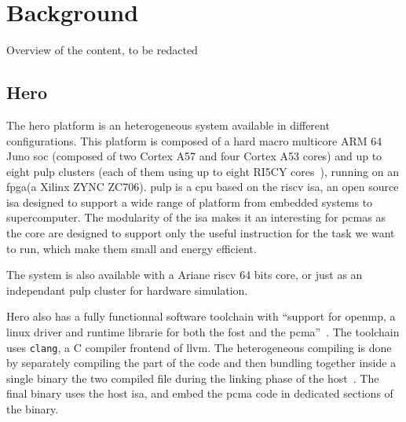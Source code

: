 
\chapter{Background}
		Overview of the content, to be redacted
\section{Hero}
	The \gls{hero} platform is an heterogeneous system available in different configurations. 
	This platform is composed of a hard macro multicore ARM 64 Juno \gls{soc} (composed of two Cortex A57 and four Cortex A53 cores) and up to eight \gls{pulp} clusters (each of them using up to eight RI5CY cores~\cite{Art:Hero}), running on an \gls{fpga}(a Xilinx ZYNC ZC706).
	\Gls{pulp} is a \gls{cpu} based on the \gls{riscv} \gls{isa}, an open source \gls{isa} designed to support a wide range of platform from embedded systems to supercomputer.
	The modularity of the \gls{isa} makes it an interesting for \glspl{pcma} as the core are designed to support only the useful instruction for the task we want to run, which make them small and energy efficient.

	The system is also available with a Ariane \gls{riscv} 64 bits core, or just as an independant \gls{pulp} cluster for hardware simulation.


	Hero also has a fully functionnal software toolchain with ``support for \gls{openmp}, a linux driver and runtime librarie for both the fost and the \gls{pcma}''~\cite{Art:Hero}. The toolchain uses \texttt{clang}, a C compiler frontend of \gls{llvm}.
	The heterogeneous compiling is done by separately compiling the part of the code and then bundling together inside a single binary the two compiled file during the linking phase of the host~\cite{Report:SoftwareStack}. The final binary uses the host \gls{isa}, and embed the \gls{pcma} code in dedicated sections of the binary.





